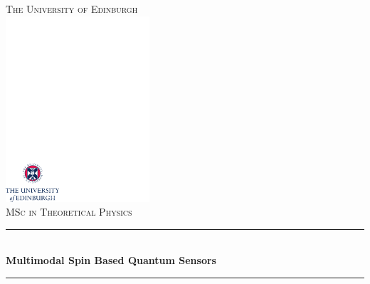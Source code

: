 \begin{titlepage}

\newcommand{\HRule}{\rule{\linewidth}{0.5mm}} %

\center %
 

\textsc{\LARGE The University of Edinburgh}\\[1.5cm] %
\includegraphics[width=0.4\textwidth]{../crest.pdf}\\[1cm] %
\textsc{\Large MSc in Theoretical Physics}\\[0.5cm] %


\HRule \\[0.4cm]
{ \Huge \bfseries\rmfamily Multimodal Spin Based Quantum Sensors}\\[0.4cm] %
\HRule \\[1.5cm]
 


\end{titlepage}
